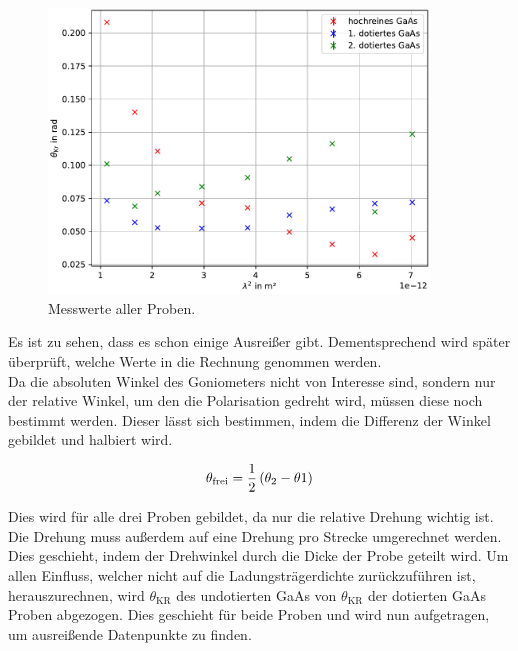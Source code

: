\begin{figure}[H]
    \centering
    \includegraphics[width=0.9\textwidth]{../Kristallwinkel.pdf}
    \caption{Messwerte aller Proben.}
    \label{fig:roh}
\end{figure}

\noindent Es ist zu sehen, dass es schon einige Ausreißer gibt. Dementsprechend wird später überprüft, welche 
Werte in die Rechnung genommen werden.\\
\noindent Da die absoluten Winkel des Goniometers nicht von Interesse sind, sondern nur der relative 
Winkel, um den die Polarisation gedreht wird, müssen diese noch bestimmt werden. Dieser lässt sich 
bestimmen, indem die Differenz der Winkel gebildet und halbiert wird.

\begin{equation}
    \centering
    \theta_\text{frei}=\frac{1}{2} \left(\theta_2 - \theta 1 \right)
    \label{eqn:theta_frei}
\end{equation}

\noindent Dies wird für alle drei Proben gebildet, da nur die relative Drehung wichtig ist. 
Die Drehung muss außerdem auf eine Drehung pro Strecke umgerechnet werden. Dies geschieht, indem der Drehwinkel 
durch die Dicke der Probe geteilt wird.
Um allen Einfluss, welcher nicht auf die Ladungsträgerdichte zurückzuführen ist, herauszurechnen, wird 
$\theta_\text{KR}$ des undotierten GaAs von $\theta_\text{KR}$ der dotierten GaAs Proben abgezogen. 
Dies geschieht für beide Proben und wird nun aufgetragen, um ausreißende Datenpunkte zu finden.

